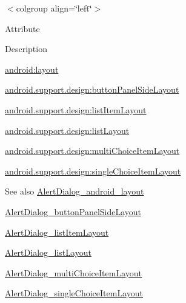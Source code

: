 \tabulinesep=1mm
\begin{longtabu} spread 0pt [c]{*{0}{|X[-1]}|}
\hline
\end{longtabu}
$<$colgroup align=\char`\"{}left\char`\"{}$>$ 

Attribute

Description 

{\ttfamily \hyperlink{classandroid_1_1support_1_1design_1_1R_1_1styleable_a44416be9417cbf35871f322ed12b807f}{android\+:layout}}

{\ttfamily \hyperlink{classandroid_1_1support_1_1design_1_1R_1_1styleable_a91b90d0ee4293fa8574bdff3e999127f}{android.\+support.\+design\+:button\+Panel\+Side\+Layout}}

{\ttfamily \hyperlink{classandroid_1_1support_1_1design_1_1R_1_1styleable_afa996611e1e7845aac83c49748a573b9}{android.\+support.\+design\+:list\+Item\+Layout}}

{\ttfamily \hyperlink{classandroid_1_1support_1_1design_1_1R_1_1styleable_a017ed84952eefc77dac2cae8ffba67c1}{android.\+support.\+design\+:list\+Layout}}

{\ttfamily \hyperlink{classandroid_1_1support_1_1design_1_1R_1_1styleable_a34d96148dd7a784337c42ef3b86ce153}{android.\+support.\+design\+:multi\+Choice\+Item\+Layout}}

{\ttfamily \hyperlink{classandroid_1_1support_1_1design_1_1R_1_1styleable_ae17be3e7b2e63e091946463a9e26a522}{android.\+support.\+design\+:single\+Choice\+Item\+Layout}}

\begin{DoxySeeAlso}{See also}
\hyperlink{classandroid_1_1support_1_1design_1_1R_1_1styleable_a44416be9417cbf35871f322ed12b807f}{Alert\+Dialog\+\_\+android\+\_\+layout} 

\hyperlink{classandroid_1_1support_1_1design_1_1R_1_1styleable_a91b90d0ee4293fa8574bdff3e999127f}{Alert\+Dialog\+\_\+button\+Panel\+Side\+Layout} 

\hyperlink{classandroid_1_1support_1_1design_1_1R_1_1styleable_afa996611e1e7845aac83c49748a573b9}{Alert\+Dialog\+\_\+list\+Item\+Layout} 

\hyperlink{classandroid_1_1support_1_1design_1_1R_1_1styleable_a017ed84952eefc77dac2cae8ffba67c1}{Alert\+Dialog\+\_\+list\+Layout} 

\hyperlink{classandroid_1_1support_1_1design_1_1R_1_1styleable_a34d96148dd7a784337c42ef3b86ce153}{Alert\+Dialog\+\_\+multi\+Choice\+Item\+Layout} 

\hyperlink{classandroid_1_1support_1_1design_1_1R_1_1styleable_ae17be3e7b2e63e091946463a9e26a522}{Alert\+Dialog\+\_\+single\+Choice\+Item\+Layout} 
\end{DoxySeeAlso}
\mbox{\label{classandroid_1_1support_1_1design_1_1R_1_1styleable_a44416be9417cbf35871f322ed12b807f}} 
